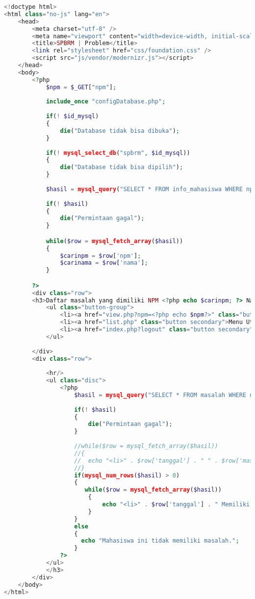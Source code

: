 \begin{lstlisting}[language=php,basicstyle=\tiny,caption=problem.php]
<!doctype html>
<html class="no-js" lang="en">
	<head>
		<meta charset="utf-8" />
		<meta name="viewport" content="width=device-width, initial-scale=1.0" />
		<title>SPBRM | Problem</title>
		<link rel="stylesheet" href="css/foundation.css" />
		<script src="js/vendor/modernizr.js"></script>
	</head>
	<body>
		<?php
			$npm = $_GET["npm"];
			
			include_once "configDatabase.php";
				
			if(! $id_mysql)
			{
				die("Database tidak bisa dibuka");
			}
				
			if(! mysql_select_db("spbrm", $id_mysql))
			{
				die("Database tidak bisa dipilih");
			}
			
			$hasil = mysql_query("SELECT * FROM info_mahasiswa WHERE npm='$npm'", $id_mysql);
			
			if(! $hasil)
			{
				die("Permintaan gagal");
			}

			while($row = mysql_fetch_array($hasil))
			{
				$carinpm = $row['npm'];
				$carinama = $row['nama'];
			}

		?> 
		<div class="row">
		<h3>Daftar masalah yang dimiliki NPM <?php echo $carinpm; ?> Nama <?php echo $carinama; ?>
			<ul class="button-group">
				<li><a href="view.php?npm=<?php echo $npm?>" class="button secondary">Kembali</a></li>
				<li><a href="list.php" class="button secondary">Menu Utama</a></li>
				<li><a href="index.php?logout" class="button secondary">Logout</a></li>
			</ul>
			
		</div>
		<div class="row">
			
			<hr/>
			<ul class="disc">
				<?php
					$hasil = mysql_query("SELECT * FROM masalah WHERE npm='$npm' ORDER BY id_masalah DESC", $id_mysql);
			
					if(! $hasil)
					{
						die("Permintaan gagal");
					}
					
					//while($row = mysql_fetch_array($hasil))
					//{
					//	echo "<li>" . $row['tanggal'] . " " . $row['masalah_dengan'] . " " . $row['masalah'] . "</li>";
					//}
					if(mysql_num_rows($hasil) > 0)
					{
					   while($row = mysql_fetch_array($hasil))
					    {
							echo "<li>" . $row['tanggal'] . " Memiliki masalah dengan/pada kelas " . $row['masalah_dengan'] . ", masalahnya adalah " . $row['masalah'] . ".</li>";
						}
					}
					else
					{
					  echo "Mahasiswa ini tidak memiliki masalah.";
					}
				?>
			</ul>
			</h3>
		</div>
	</body>
</html>
\end{lstlisting}

